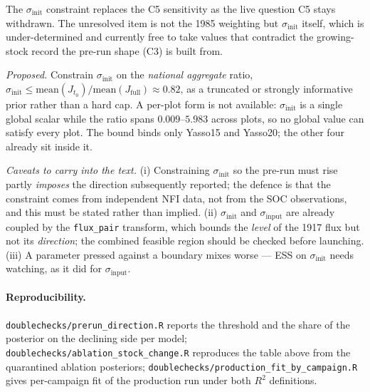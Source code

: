 \documentclass[11pt]{article}
\newcommand{\sinit}{\sigma_{\mathrm{init}}}
\newcommand{\sinput}{\sigma_{\mathrm{input}}}
\begin{document}
\begin{decision}{The $\sinit$ constraint replaces the C5 sensitivity as the live question}
C5 stays withdrawn. The unresolved item is not the 1985 weighting but $\sinit$ itself, which is
under-determined and currently free to take values that contradict the growing-stock record the
pre-run shape (C3) is built from.

\smallskip
\emph{Proposed.} Constrain $\sinit$ on the \emph{national aggregate} ratio,
$\sinit \le \mathrm{mean}(J_{t_0})/\mathrm{mean}(J_{\mathrm{full}}) \approx 0.82$, as a
truncated or strongly informative prior rather than a hard cap. A per-plot form is not
available: $\sinit$ is a single global scalar while the ratio spans $0.009$--$5.983$ across
plots, so no global value can satisfy every plot. The bound binds only Yasso15 and Yasso20; the
other four already sit inside it.

\smallskip
\emph{Caveats to carry into the text.} (i) Constraining $\sinit$ so the pre-run must rise partly
\emph{imposes} the direction subsequently reported; the defence is that the constraint comes
from independent NFI data, not from the SOC observations, and this must be stated rather than
implied. (ii) $\sinit$ and $\sinput$ are already coupled by the \texttt{flux\_pair} transform,
which bounds the \emph{level} of the 1917 flux but not its \emph{direction}; the combined
feasible region should be checked before launching. (iii) A parameter pressed against a
boundary mixes worse --- ESS on $\sinit$ needs watching, as it did for $\sinput$.
\end{decision}

\paragraph{Reproducibility.} \texttt{doublechecks/prerun\_direction.R} reports the threshold and
the share of the posterior on the declining side per model;
\texttt{doublechecks/ablation\_stock\_change.R} reproduces the table above from the quarantined
ablation posteriors; \texttt{doublechecks/production\_fit\_by\_campaign.R} gives per-campaign
fit of the production run under both $R^2$ definitions.
\end{document}
